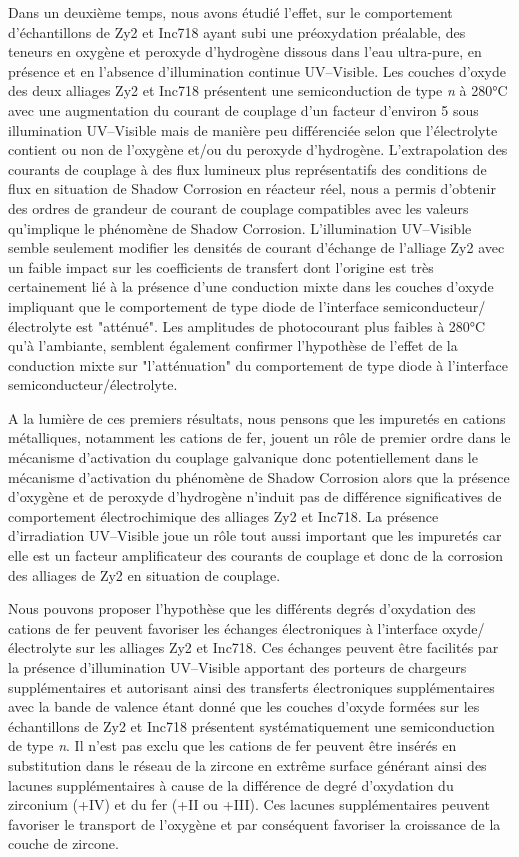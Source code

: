 \begin{refsection}
Dans un deuxième temps, nous avons étudié l’effet, sur le comportement d’échantillons de Zy2 et Inc718 ayant subi une
préoxydation préalable, des teneurs en oxygène et peroxyde d’hydrogène dissous dans l’eau ultra-pure, en présence et en
l’absence d’illumination continue UV--Visible. Les couches d'oxyde des deux alliages Zy2 et Inc718 présentent une semiconduction de type
\emph{n} à
280°C avec une augmentation du courant de couplage d’un facteur d’environ 5 sous illumination UV--Visible mais de manière
peu différenciée selon que l’électrolyte contient ou non de l’oxygène et/ou du peroxyde d’hydrogène. L’extrapolation des
courants de couplage à des flux lumineux plus représentatifs des conditions de flux en situation de Shadow
Corrosion en réacteur réel, nous a permis d’obtenir des ordres de grandeur de courant de couplage compatibles avec les
valeurs qu’implique le phénomène de Shadow Corrosion. L’illumination UV--Visible semble seulement modifier les densités
de courant d’échange de l’alliage Zy2 avec un faible impact sur les coefficients de transfert dont l’origine est très
certainement lié à la présence d’une conduction mixte dans les couches d’oxyde impliquant que le comportement de type
diode de l’interface semiconducteur/électrolyte est "atténué". Les amplitudes de photocourant plus faibles à 280°C
qu’à l’ambiante, semblent également confirmer l’hypothèse de l’effet de la conduction mixte sur "l’atténuation" du
comportement de type diode à l’interface semiconducteur/électrolyte.

A la lumière de ces premiers résultats, nous pensons que les impuretés en cations métalliques, notamment les cations de
fer, jouent un rôle de premier ordre dans le mécanisme d’activation du couplage galvanique donc potentiellement dans le
mécanisme d’activation du phénomène de Shadow Corrosion alors que la présence d’oxygène et de peroxyde d’hydrogène
n’induit pas de différence significatives de comportement électrochimique des alliages Zy2 et Inc718. 
La présence d’irradiation UV--Visible joue un
rôle tout aussi important que les impuretés car elle est un facteur amplificateur des 
courants de couplage et donc de la corrosion des alliages de Zy2 en
situation de couplage. 

Nous pouvons proposer l’hypothèse que les différents degrés d’oxydation des cations de fer peuvent favoriser les
échanges électroniques à l’interface oxyde/électrolyte sur les alliages Zy2 et Inc718. Ces échanges peuvent être
facilités par la présence d’illumination UV--Visible apportant des porteurs de chargeurs supplémentaires et autorisant
ainsi des transferts électroniques supplémentaires avec la bande de valence étant donné que les couches d’oxyde formées
sur les échantillons de Zy2 et Inc718 présentent systématiquement une semiconduction de type \emph{n}. Il n’est pas exclu que
les cations de fer peuvent être insérés en substitution dans le réseau de la zircone en extrême surface générant ainsi
des lacunes supplémentaires à cause de la différence de degré d’oxydation du zirconium (+IV) et du fer (+II ou +III).
Ces lacunes supplémentaires peuvent favoriser le transport de l’oxygène et par conséquent favoriser la croissance de la
couche de zircone.


\end{refsection}
